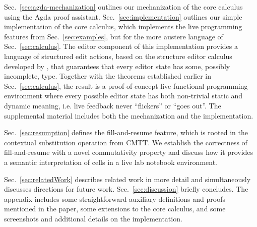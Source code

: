 Sec.~\ref{sec:agda-mechanization} outlines our mechanization of the core calculus using the Agda proof assistant. 
Sec.~\ref{sec:implementation} outlines our simple implementation of the core calculus, which implements the live programming features from Sec.~\ref{sec:examples},
but for the more austere language of Sec.~\ref{sec:calculus}. 
The editor component of this implementation provides a language of structured edit actions, 
based on the \Hazelnut structure editor calculus developed by \cite{popl-paper}, that guarantees that
every editor state has some, possibly incomplete, type. 
Together with the theorems established earlier in Sec.~\ref{sec:calculus}, the result is a proof-of-concept
live functional programming environment where every possible editor state has both non-trivial static and dynamic 
meaning, i.e. live feedback never ``flickers'' or ``goes out''. 
The supplemental material includes both the mechanization and the implementation.

Sec.~\ref{sec:resumption} defines the fill-and-resume feature, which is rooted in the contextual substitution operation from CMTT. We establish the correctness of fill-and-resume with a novel commutativity property and discuss how it provides a semantic interpretation of cells in a live lab notebook environment.

Sec.~\ref{sec:relatedWork} describes related work in more detail and simultaneously discusses directions for future work. Sec.~\ref{sec:discussion} briefly concludes. The appendix includes some straightforward auxiliary definitions and proofs mentioned in the paper, some extensions to the core calculus, and some screenshots and additional details on the implementation. 